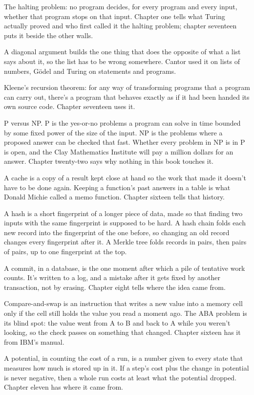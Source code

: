 \documentclass[11pt,twoside]{article}
\theoremstyle{thielethm}
\theoremstyle{thieledef}
\theoremstyle{thieledef}
\theoremstyle{thieledef}
\theoremstyle{thielethm}
\theoremstyle{thieleobs}
\theoremstyle{thielethm}
\begin{document}
The halting problem: no program decides, for every program and every input, whether that program stops on that input. Chapter one tells what Turing actually proved and who first called it the halting problem; chapter seventeen puts it beside the other walls.

A diagonal argument builds the one thing that does the opposite of what a list says about it, so the list has to be wrong somewhere. Cantor used it on lists of numbers, Gödel and Turing on statements and programs.

Kleene's recursion theorem: for any way of transforming programs that a program can carry out, there's a program that behaves exactly as if it had been handed its own source code. Chapter seventeen uses it.

P versus NP. P is the yes-or-no problems a program can solve in time bounded by some fixed power of the size of the input. NP is the problems where a proposed answer can be checked that fast. Whether every problem in NP is in P is open, and the Clay Mathematics Institute will pay a million dollars for an answer. Chapter twenty-two says why nothing in this book touches it.

A cache is a copy of a result kept close at hand so the work that made it doesn't have to be done again. Keeping a function's past answers in a table is what Donald Michie called a memo function. Chapter sixteen tells that history.

A hash is a short fingerprint of a longer piece of data, made so that finding two inputs with the same fingerprint is supposed to be hard. A hash chain folds each new record into the fingerprint of the one before, so changing an old record changes every fingerprint after it. A Merkle tree folds records in pairs, then pairs of pairs, up to one fingerprint at the top.

A commit, in a database, is the one moment after which a pile of tentative work counts. It's written to a log, and a mistake after it gets fixed by another transaction, not by erasing. Chapter eight tells where the idea came from.

Compare-and-swap is an instruction that writes a new value into a memory cell only if the cell still holds the value you read a moment ago. The ABA problem is its blind spot: the value went from A to B and back to A while you weren't looking, so the check passes on something that changed. Chapter sixteen has it from IBM's manual.

A potential, in counting the cost of a run, is a number given to every state that measures how much is stored up in it. If a step's cost plus the change in potential is never negative, then a whole run costs at least what the potential dropped. Chapter eleven has where it came from.
\end{document}

